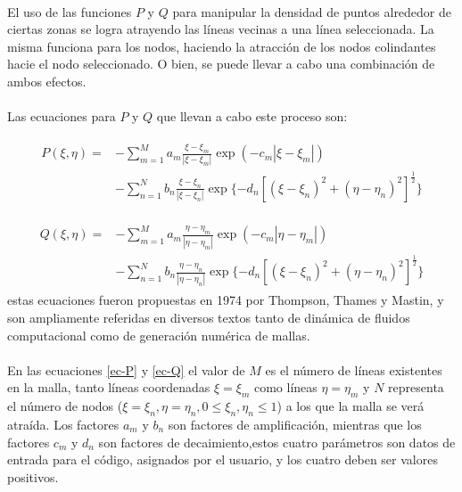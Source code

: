 \documentclass[letterpaper, openright, 12pt]{book}
\begin{document}
			\paragraph*{}
				El uso de las funciones $P$ y $Q$ para manipular la densidad de puntos alrededor de ciertas zonas se logra atrayendo las líneas vecinas a una línea seleccionada. La misma funciona para los nodos, haciendo la atracción de los nodos colindantes hacie el nodo seleccionado. O bien, se puede llevar a cabo una combinación de ambos efectos.
			
			\paragraph*{}
				Las ecuaciones para $P$ y $Q$ que llevan a cabo este proceso son:
				
				\begin{align}
					\begin{aligned}
						P(\xi, \eta) =& - \sum_{m = 1}^{M} a_{m} \frac{\xi - \xi_{m}}{|\xi - \xi_{m}|} \exp(-c_{m}|\xi - \xi_{m}|) \\&
						- \sum_{n=1}^{N} b_{n} \frac{\xi - \xi_{n}}{| \xi - \xi_{n} |} \exp\lbrace -d_{n} \left[ \left( \xi - \xi_{n} \right)^2 + \left( \eta - \eta_{n} \right)^2 \right]^\frac{1}{2} \rbrace
					\end{aligned}
					\label{ec-P}
				\end{align}
				
				\begin{align}
					\begin{aligned}
						Q(\xi, \eta) =& - \sum_{m = 1}^{M} a_{m} \frac{\eta - \eta_{m}}{|\eta - \eta_{m}|} \exp(-c_{m}|\eta - \eta_{m}|) \\&
						- \sum_{n=1}^{N} b_{n} \frac{\eta - \eta_{n}}{| \eta - \eta_{n} |} \exp\lbrace -d_{n} \left[ \left( \xi - \xi_{n} \right)^2 + \left( \eta - \eta_{n} \right)^2 \right]^\frac{1}{2} \rbrace
					\end{aligned}
					\label{ec-Q}
				\end{align}
				estas ecuaciones fueron propuestas en 1974 por Thompson, Thames y Mastin\cite{thompson1974automatic}, y son ampliamente referidas en diversos textos tanto de dinámica de fluidos computacional como de generación numérica de mallas.
				
			\paragraph*{}
				En las ecuaciones \ref{ec-P} y \ref{ec-Q} el valor de $M$ es el número de líneas existentes en la malla, tanto líneas coordenadas $\xi = \xi_{m}$ como líneas $\eta = \eta_{m}$ y $N$ representa el número de nodos ($\xi = \xi_{n}, \eta = \eta_{n}, 0 \leq \xi_{n}, \eta_{n} \leq 1$) a los que la malla se verá atraída. Los factores $a_{m}$ y $b_{n}$ son factores de amplificación, mientras que los factores $c_{m}$ y $d_{n}$ son factores de decaimiento,estos cuatro parámetros son datos de entrada para el código, asignados por el usuario, y los cuatro deben ser valores positivos.
			
\end{document}
